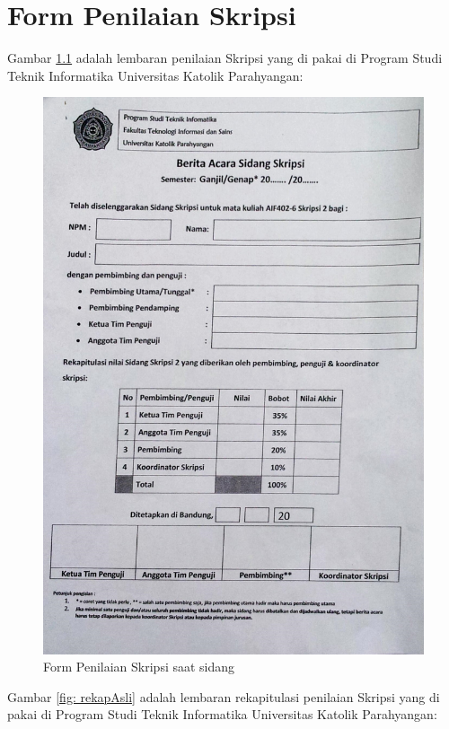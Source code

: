 \chapter{Form Penilaian Skripsi}
\label{app:A}

Gambar \ref{fig: skripsiAsli} adalah lembaran penilaian Skripsi yang di pakai di Program Studi Teknik Informatika Universitas Katolik Parahyangan:

\begin{figure}[H]
\centering
\includegraphics[scale=0.40]{Gambar/dokumen_skripsi}
\caption[Form Penilaian Skripsi saat sidang]{Form Penilaian Skripsi saat sidang} 
\label{fig: skripsiAsli}
\end{figure}
\pagebreak
Gambar \ref{fig: rekapAsli} adalah lembaran rekapitulasi penilaian Skripsi yang di pakai di Program Studi Teknik Informatika Universitas Katolik Parahyangan:

